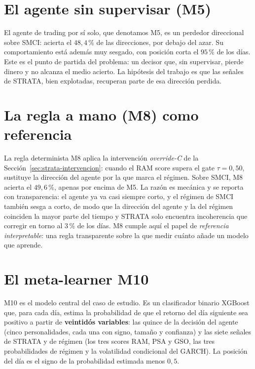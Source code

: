 \section{El agente sin supervisar (M5)}
\label{sec:m5}

El agente de trading por sí solo, que denotamos M5, es un perdedor direccional sobre SMCI: acierta el $48{,}4\,\%$ de las direcciones, por debajo del azar. Su comportamiento está además muy sesgado, con posición corta el $95\,\%$ de los días. Este es el punto de partida del problema: un decisor que, sin supervisar, pierde dinero y no alcanza el medio acierto. La hipótesis del trabajo es que las señales de STRATA, bien explotadas, recuperan parte de esa dirección perdida.

\section{La regla a mano (M8) como referencia}
\label{sec:m8}

La regla determinista M8 aplica la intervención \emph{override-C} de la Sección~\ref{sec:strata-intervencion}: cuando el RAM score supera el gate $\tau = 0{,}50$, sustituye la dirección del agente por la que marca el régimen. Sobre SMCI, M8 acierta el $49{,}6\,\%$, apenas por encima de M5. La razón es mecánica y se reporta con transparencia: el agente ya va casi siempre corto, y el régimen de SMCI también sesga a corto, de modo que la dirección del agente y la del régimen coinciden la mayor parte del tiempo y STRATA solo encuentra incoherencia que corregir en torno al $3\,\%$ de los días. M8 cumple aquí el papel de \emph{referencia interpretable}: una regla transparente sobre la que medir cuánto añade un modelo que aprende.

\section{El meta-learner M10}
\label{sec:m10}

M10 es el modelo central del caso de estudio. Es un clasificador binario XGBoost \cite{chen2016} que, para cada día, estima la probabilidad de que el retorno del día siguiente sea positivo a partir de \textbf{veintidós variables}: las quince de la decisión del agente (cinco personalidades, cada una con signo, tamaño y confianza) y las siete señales de STRATA y de régimen (los tres scores RAM, PSA y GSO, las tres probabilidades de régimen y la volatilidad condicional del GARCH). La posición del día es el signo de la probabilidad estimada menos $0{,}5$.

